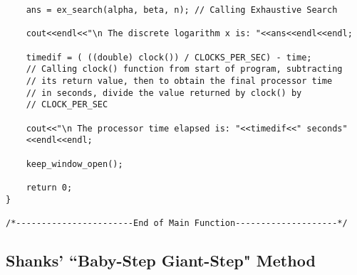\documentclass[iwp,first]{luthesis}
\begin{document}
\begin{verbatim}
    ans = ex_search(alpha, beta, n); // Calling Exhaustive Search
    
    cout<<endl<<"\n The discrete logarithm x is: "<<ans<<endl<<endl;
    
    timedif = ( ((double) clock()) / CLOCKS_PER_SEC) - time;
    // Calling clock() function from start of program, subtracting 
    // its return value, then to obtain the final processor time 
    // in seconds, divide the value returned by clock() by 
    // CLOCK_PER_SEC 
    
    cout<<"\n The processor time elapsed is: "<<timedif<<" seconds"
    <<endl<<endl;
    
    keep_window_open();
    
    return 0;
}       
    
/*-----------------------End of Main Function--------------------*/

\end{verbatim}



\subsection{Shanks' ``Baby-Step Giant-Step" Method}
\end{document}
